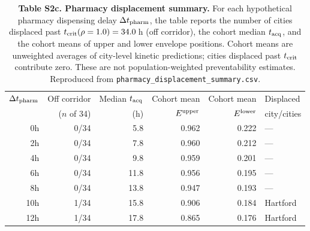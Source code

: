 \begin{table}[!htb]
\centering
\caption{\textbf{Table S2c. Pharmacy displacement summary.} For each
hypothetical pharmacy dispensing delay $\Delta t_{\rm pharm}$, the table
reports the number of cities displaced past $t_{\rm crit}(\rho=1.0) = 34.0$\,h
(off corridor), the cohort median $t_{\rm acq}$, and the cohort means of
upper and lower envelope positions. Cohort means are unweighted averages
of city-level kinetic predictions; cities displaced past $t_{\rm crit}$
contribute zero. These are not population-weighted preventability estimates.
Reproduced from \texttt{pharmacy\_displacement\_summary.csv}.}
\label{tab:S2c_displacement}
\begin{tabular}{rrrrrl}
\toprule
$\Delta t_{\rm pharm}$ & Off corridor & Median $t_{\rm acq}$ &
Cohort mean & Cohort mean & Displaced \\
 & ($n$ of 34) & (h) & $E^{\rm upper}$ & $E^{\rm lower}$ & city/cities \\
\midrule
   0h & 0/34 & 5.8 & 0.962 & 0.222 & --- \\
   2h & 0/34 & 7.8 & 0.960 & 0.212 & --- \\
   4h & 0/34 & 9.8 & 0.959 & 0.201 & --- \\
   6h & 0/34 & 11.8 & 0.956 & 0.195 & --- \\
   8h & 0/34 & 13.8 & 0.947 & 0.193 & --- \\
  10h & 1/34 & 15.8 & 0.906 & 0.184 & Hartford \\
  12h & 1/34 & 17.8 & 0.865 & 0.176 & Hartford \\
\bottomrule
\end{tabular}
\end{table}
